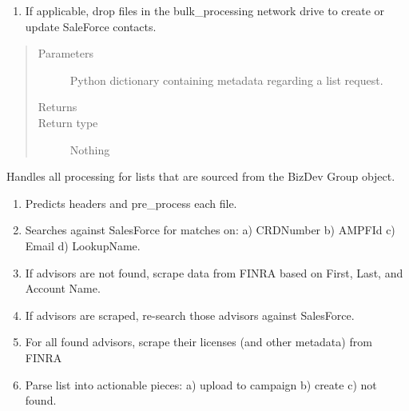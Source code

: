 \documentclass[letterpaper,10pt,english]{sphinxmanual}
\begin{document}
\begin{fulllineitems}
\begin{fulllineitems}
\begin{enumerate}
\item {} 
If applicable, drop files in the bulk\_processing network drive to create or update SaleForce contacts.

\end{enumerate}
\begin{quote}\begin{description}
\item[{Parameters}] \leavevmode
{} \textendash{} Python dictionary containing metadata regarding a list request.

\item[{Returns}] \leavevmode


\item[{Return type}] \leavevmode
Nothing

\end{description}\end{quote}

\end{fulllineitems}


\begin{fulllineitems}
\label{\detokenize{index:ListManagement.list_processing.ListProcessing.bizdev_processing}}
Handles all processing for lists that are sourced from the BizDev Group object.
\begin{enumerate}
\def\theenumi{\arabic{enumi}}
\def\labelenumi{\theenumi )}
\makeatletter\def\p@enumii{\p@enumi \theenumi )}\makeatother
\item {} 
Predicts headers and pre\_process each file.

\item {} 
Searches against SalesForce for matches on: a) CRDNumber b) AMPFId c) Email d) LookupName.

\item {} 
If advisors are not found, scrape data from FINRA based on First, Last, and Account Name.

\item {} 
If advisors are scraped, re-search those advisors against SalesForce.

\item {} 
For all found advisors, scrape their licenses (and other metadata) from FINRA

\item {} 
Parse list into actionable pieces: a) upload to campaign b) create c) not found.


\end{enumerate}
\end{fulllineitems}
\end{fulllineitems}
\end{document}
